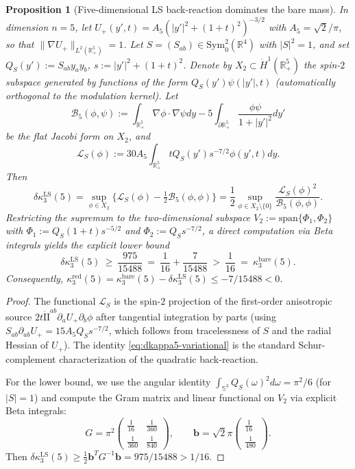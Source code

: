 \documentclass[11pt,reqno,a4paper]{amsart}
\newcommand{\R}{\mathbb{R}}
\numberwithin{equation}{section}
\theoremstyle{plain}
\newtheorem{proposition}[theorem]{Proposition}
\theoremstyle{remark}
\theoremstyle{plain}
\begin{document}
\begin{proposition}[Five-dimensional LS back-reaction dominates the bare mass]
\label{prop:dkappa5-lower-bound}
In dimension $n=5$, let
$U_+(y',t)=A_5(|y'|^2+(1+t)^2)^{-3/2}$
with $A_5=\sqrt{2}/\pi$, so that $\|\nabla U_+\|_{L^2(\R^5_+)}=1$.
Let $S=(S_{ab})\in\mathrm{Sym}^2_0(\R^4)$ with $|S|^2=1$, and set
$Q_S(y'):=S_{ab}y_ay_b$, $s:=|y'|^2+(1+t)^2$.
Denote by $X_2\subset \dot H^1(\R^5_+)$ the spin-$2$ subspace
generated by functions of the form $Q_S(y')\psi(|y'|,t)$
(automatically orthogonal to the modulation kernel).
Let
\[
\mathcal B_5(\phi,\psi)
:=\int_{\R^5_+}\nabla\phi\cdot\nabla\psi dy
-5\int_{\partial\R^5_+}\frac{\phi\psi}{1+|y'|^2}dy'
\]
be the flat Jacobi form on $X_2$, and
\[
\mathcal L_S(\phi)
:=30A_5\int_{\R^5_+} tQ_S(y')s^{-7/2}\phi(y',t)dy.
\]
Then
\begin{equation}\label{eq:dkappa5-variational}
\delta\kappa_3^{\mathrm{LS}}(5)
=\sup_{\phi\in X_2}\bigl\{\mathcal L_S(\phi)-\tfrac12\mathcal B_5(\phi,\phi)\bigr\}
=\frac12\sup_{\phi\in X_2\setminus\{0\}}
\frac{\mathcal L_S(\phi)^2}{\mathcal B_5(\phi,\phi)}.
\end{equation}
Restricting the supremum to the two-dimensional subspace
$V_2:=\mathrm{span}\{\Phi_1,\Phi_2\}$ with
$\Phi_1:=Q_S(1+t)s^{-5/2}$ and $\Phi_2:=Q_Ss^{-7/2}$,
a direct computation via Beta integrals yields the explicit lower bound
\begin{equation}\label{eq:dkappa5-lower-bound}
\delta\kappa_3^{\mathrm{LS}}(5)
\ \ge\ \frac{975}{15488}
\ =\ \frac1{16}+\frac{7}{15488}
\ >\ \frac1{16}
\ =\ \kappa_3^{\mathrm{bare}}(5).
\end{equation}
Consequently,
$\kappa_3^{\mathrm{red}}(5)
=\kappa_3^{\mathrm{bare}}(5)-\delta\kappa_3^{\mathrm{LS}}(5)
\le -7/15488<0$.
\end{proposition}

\begin{proof}
The functional $\mathcal L_S$ is the spin-$2$ projection of the
first-order anisotropic source $2t\mathring{\mathrm{II}}^{ab}\partial_aU_+\partial_b\phi$
after tangential integration by parts
(using $S_{ab}\partial_{ab}U_+=15A_5Q_Ss^{-7/2}$, which follows from
tracelessness of $S$ and the radial Hessian of $U_+$).
The identity \eqref{eq:dkappa5-variational} is the standard Schur-complement
characterization of the quadratic back-reaction.

For the lower bound, we use the angular identity
$\int_{\mathbb S^3}Q_S(\omega)^2d\omega=\pi^2/6$ (for $|S|=1$)
and compute the Gram matrix and linear functional on $V_2$
via explicit Beta integrals:
\[
G=\pi^2
\begin{pmatrix}
\frac1{16} & \frac1{360}\\[1mm]
\frac1{360} & \frac1{840}
\end{pmatrix},
\qquad
\mathbf b=\sqrt2\pi
\begin{pmatrix}
\frac1{16}\\[1mm]
\frac1{480}
\end{pmatrix}.
\]
Then
$\delta\kappa_3^{\mathrm{LS}}(5)
\ge \frac12\mathbf b^TG^{-1}\mathbf b
=975/15488>1/16$.
\end{proof}
\end{document}
